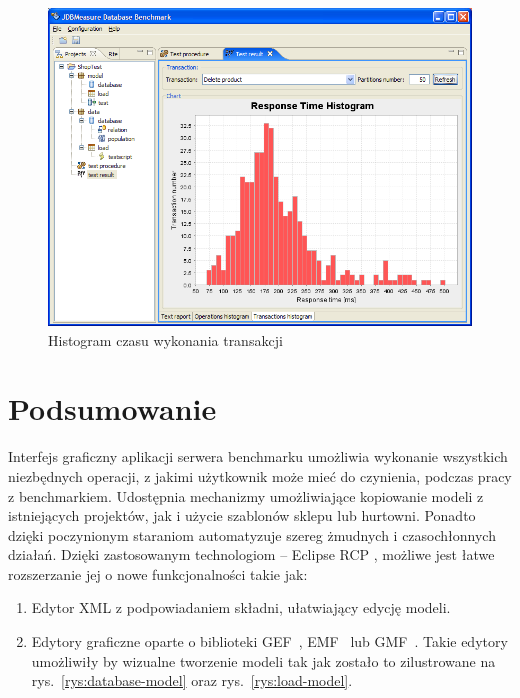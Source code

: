 \begin{figure}[!h]
\begin{center}
\includegraphics[width=0.9\linewidth]{figures/gui/32.png}
\end{center}
\caption{Histogram czasu wykonania transakcji}\label{rys:histtrans}
\end{figure}

\section{Podsumowanie}
Interfejs graficzny aplikacji serwera benchmarku umożliwia wykonanie
wszystkich niezbędnych operacji, z jakimi użytkownik może mieć do czynienia,
podczas pracy z benchmarkiem. Udostępnia mechanizmy umożliwiające kopiowanie modeli z istniejących projektów,
jak i użycie szablonów sklepu lub hurtowni. Ponadto dzięki poczynionym staraniom automatyzuje
szereg żmudnych i czasochłonnych działań. Dzięki zastosowanym technologiom -- Eclipse RCP \cite{RCP1}, możliwe jest łatwe
rozszerzanie jej o nowe funkcjonalności takie jak:
\begin{enumerate}
\item Edytor XML z podpowiadaniem składni, ułatwiający edycję modeli.
\item Edytory graficzne oparte o biblioteki GEF~\cite{GEF1}, EMF~\cite{EMF1} lub GMF~\cite{GMF1}. Takie edytory 
umożliwiły by wizualne tworzenie modeli tak jak zostało to zilustrowane na rys.~\ref{rys:database-model} 
oraz rys.~\ref{rys:load-model}.
\end{enumerate}

